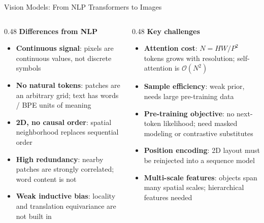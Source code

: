 \begin{frame}[t]{Vision Models: From NLP Transformers to Images}
  \vspace{-0.3em}
  \begin{columns}
    \begin{column}{0.48\textwidth}
      \textbf{Differences from NLP}
      \begin{itemize}
        \item \textbf{Continuous signal}: pixels are continuous values, not discrete symbols
        \item \textbf{No natural tokens}: patches are an arbitrary grid; text has words / BPE units of meaning
        \item \textbf{2D, no causal order}: spatial neighborhood replaces sequential order
        \item \textbf{High redundancy}: nearby patches are strongly correlated; word content is not
        \item \textbf{Weak inductive bias}: locality and translation equivariance are not built in
      \end{itemize}
    \end{column}
    \begin{column}{0.48\textwidth}
      \textbf{Key challenges}
      \begin{itemize}
        \item \textbf{Attention cost}: $N = HW/P^2$ tokens grows with resolution; self-attention is $\mathcal{O}(N^2)$
        \item \textbf{Sample efficiency}: weak prior, needs large pre-training data
        \item \textbf{Pre-training objective}: no next-token likelihood; need masked modeling or contrastive substitutes
        \item \textbf{Position encoding}: 2D layout must be reinjected into a sequence model
        \item \textbf{Multi-scale features}: objects span many spatial scales; hierarchical features needed
      \end{itemize}
    \end{column}
  \end{columns}

\end{frame}

